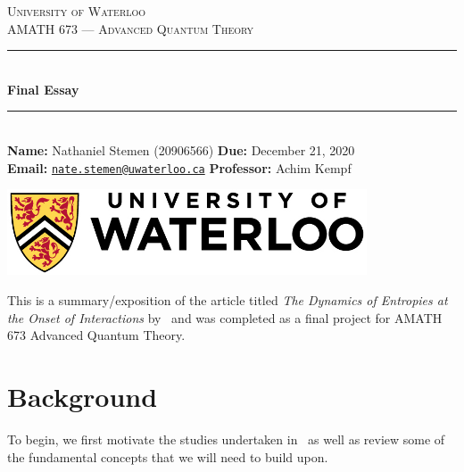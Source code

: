 \documentclass[11pt,english]{article}
\theoremstyle{definition}
\begin{document}
\begin{titlepage}
	\newcommand{\HRule}{\rule{\linewidth}{0.5mm}}

	\begin{center}

		\textsc{\LARGE University of Waterloo}\\[1.5cm]

		\textsc{\large AMATH 673 --- Advanced Quantum Theory}\\[0.75cm]

		\HRule{}\\[0.4cm]

		{\huge\bfseries Final Essay}\\[0.15cm]

		\HRule{}\\[1cm]

		{\large
		\textbf{Name:} Nathaniel Stemen (20906566)\hspace{\fill} \textbf{Due:} December 21, 2020 \\
		\textbf{Email:} \href{mailto:nate.stemen@uwaterloo.ca}{\texttt{nate.stemen@uwaterloo.ca}} \hspace{\fill} \textbf{Professor:} Achim Kempf
		}

		\vfill
		\includegraphics[width=0.8\textwidth]{uwlogo.jpg}\\[1cm]
	\end{center}
\end{titlepage}

\begingroup
{}
\hypersetup{linkcolor=darkblue}
\tableofcontents
\endgroup

\renewcommand{\baselinestretch}{1.4}

\vspace{0.5cm}
This is a summary/exposition of the article titled \emph{The Dynamics of Entropies at the Onset of Interactions} by~\citeauthor{dynamic-entropies} and was completed as a final project for AMATH 673 Advanced Quantum Theory.

\section{Background}
To begin, we first motivate the studies undertaken in~\cite{dynamic-entropies} as well as review some of the fundamental concepts that we will need to build upon.
\end{document}
